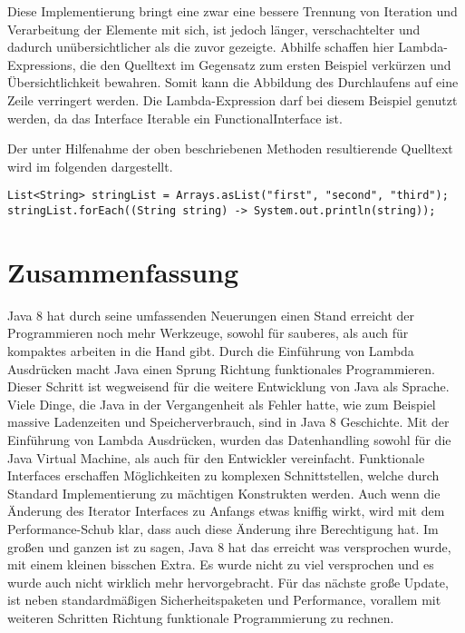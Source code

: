 Diese Implementierung bringt eine zwar eine bessere Trennung von Iteration und
Verarbeitung der Elemente mit sich, ist jedoch länger, verschachtelter und
dadurch unübersichtlicher als die zuvor gezeigte. Abhilfe schaffen hier
Lambda-Expressions, die den Quelltext im Gegensatz zum ersten Beispiel verkürzen
und Übersichtlichkeit bewahren. Somit kann die Abbildung des Durchlaufens auf
eine Zeile verringert werden.
Die Lambda-Expression darf bei diesem Beispiel genutzt werden, da das Interface
Iterable ein FunctionalInterface ist.

Der unter Hilfenahme der oben beschriebenen Methoden resultierende Quelltext
wird im folgenden dargestellt.

\begin{lstlisting}
List<String> stringList = Arrays.asList("first", "second", "third");
stringList.forEach((String string) -> System.out.println(string));
\end{lstlisting}

\chapter{Zusammenfassung}
\label{sec:Fazit}
Java 8 hat durch seine umfassenden Neuerungen einen Stand erreicht der
Programmieren noch mehr Werkzeuge, sowohl für sauberes, als auch für kompaktes
arbeiten in die Hand gibt. Durch die Einführung von Lambda Ausdrücken macht Java
einen Sprung Richtung funktionales Programmieren. Dieser Schritt ist wegweisend
für die weitere Entwicklung von Java als Sprache. Viele Dinge, die Java in der
Vergangenheit als Fehler hatte, wie zum Beispiel massive Ladenzeiten und
Speicherverbrauch, sind in Java 8 Geschichte. Mit der Einführung von Lambda
Ausdrücken, wurden das Datenhandling sowohl für die Java Virtual Machine, als
auch für den Entwickler vereinfacht. Funktionale Interfaces erschaffen
Möglichkeiten zu komplexen Schnittstellen, welche durch Standard Implementierung
zu mächtigen Konstrukten werden. Auch wenn die Änderung des Iterator Interfaces
zu Anfangs etwas kniffig wirkt, wird mit dem Performance-Schub klar, dass auch
diese Änderung ihre Berechtigung hat. Im großen und ganzen ist zu sagen, Java 8
hat das erreicht was versprochen wurde, mit einem kleinen bisschen Extra. Es
wurde nicht zu viel versprochen und es wurde auch nicht wirklich mehr
hervorgebracht. Für das nächste große Update, ist neben standardmäßigen
Sicherheitspaketen und Performance, vorallem mit weiteren Schritten Richtung
funktionale Programmierung zu rechnen.
